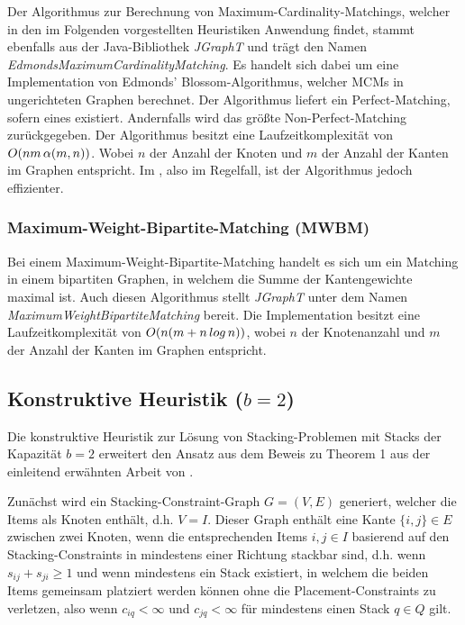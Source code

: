 Der Algorithmus zur Berechnung von Maximum-Cardinality-Matchings, welcher in den im Folgenden
vorgestellten Heuristiken Anwendung findet, stammt ebenfalls aus der Java-Bibliothek \textit{JGraphT} \cite{JGraphT} und trägt
den Namen \textit{EdmondsMaximumCardinalityMatching}. Es handelt sich dabei um eine Implementation von Edmonds' Blossom-Algorithmus,
welcher MCMs in ungerichteten Graphen berechnet. Der Algorithmus liefert ein Perfect-Matching, sofern eines existiert.
Andernfalls wird das größte Non-Perfect-Matching zurückgegeben.
Der Algorithmus besitzt eine Laufzeitkomplexität von $O(nm \thinspace \alpha(m, n))$. Wobei $n$ der Anzahl der Knoten
und $m$ der Anzahl der Kanten im Graphen entspricht. Im , also im Regelfall, ist der Algorithmus jedoch effizienter.

\subsubsection{Maximum-Weight-Bipartite-Matching (MWBM)}
\label{sec:digression_mwbm}

Bei einem Maximum-Weight-Bipartite-Matching handelt es sich um ein Matching in einem bipartiten Graphen,
in welchem die Summe der Kantengewichte maximal ist. Auch diesen Algorithmus stellt \textit{JGraphT} \cite{JGraphT}
unter dem Namen \textit{MaximumWeightBipartiteMatching} bereit.
Die Implementation besitzt eine Laufzeitkomplexität von $O(n (m + n \thinspace log \thinspace n))$, wobei $n$ der Knotenanzahl
und $m$ der Anzahl der Kanten im Graphen entspricht.

\subsection{Konstruktive Heuristik ($b = 2$)}
\label{sec:two_cap_heuristic}

Die konstruktive Heuristik zur Lösung von Stacking-Problemen mit Stacks der Kapazität $b=2$ erweitert den Ansatz aus dem Beweis
zu Theorem 1 aus der einleitend erwähnten Arbeit von \citet{Bruns2015}.

Zunächst wird ein Stacking-Constraint-Graph $G = (V, E)$ generiert, welcher die Items als Knoten enthält, d.h. $V = I$. Dieser Graph
enthält eine Kante $\{i, j\} \in E$ zwischen zwei Knoten, wenn die entsprechenden Items $i, j \in I$ basierend auf den Stacking-Constraints
in mindestens einer Richtung stackbar sind, d.h. wenn $s_{ij} + s_{ji} \geq 1$ und wenn mindestens ein Stack existiert, in welchem die beiden Items gemeinsam platziert werden können ohne die Placement-Constraints zu verletzen, also wenn $c_{iq} < \infty$ und $c_{jq} < \infty$ für
mindestens einen Stack $q \in Q$ gilt.

